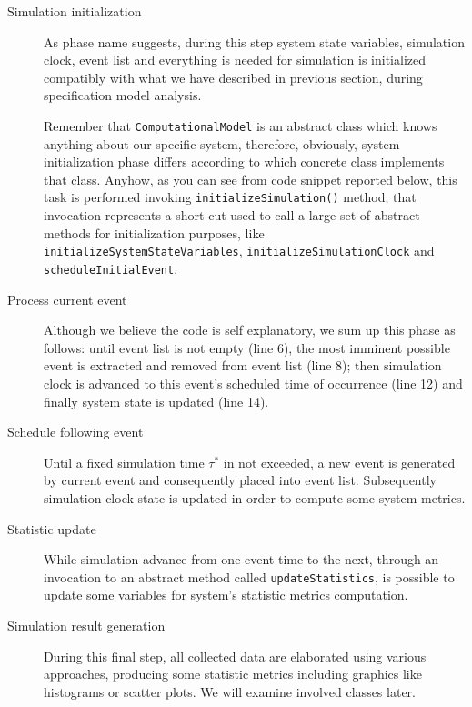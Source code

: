 \documentclass[10pt,a4paper]{article}
\begin{document}
\begin{description}
\item[Simulation initialization] As phase name suggests, during this step system state variables, simulation clock, event list and everything is needed for simulation is initialized compatibly with what we have described in previous section, during specification model analysis.

Remember that \texttt{ComputationalModel} is an abstract class which knows anything about our specific system, therefore, obviously, system initialization phase differs according to which concrete class implements that class. Anyhow, as you can see from code snippet reported below, this task is performed invoking \texttt{initialize\-Simulation()} method; that invocation represents a short-cut used to call a large set of abstract methods for initialization purposes, like \texttt{initializeSystemStateVariables}, \texttt{initializeSimulationClock} and \texttt{scheduleInitialEvent}.

\item[Process current event] Although we believe the code is self explanatory, we sum up this phase as follows: until event list is not empty (line 6), the most imminent possible event is extracted and removed from event list (line 8); then simulation clock is advanced to this event's scheduled time of occurrence (line 12) and finally system state is updated (line 14). 

\item[Schedule following event] Until a fixed simulation time $\tau^*$ in not exceeded, a new event is generated by current event and consequently placed into event list. Subsequently simulation clock state is updated in order to compute some system metrics.

\item[Statistic update] While simulation advance from one event time to the next, through an invocation to an abstract method called \texttt{updateStati\-stics}, is possible to update some variables for system's statistic metrics computation.

\item[Simulation result generation] During this final step, all collected data are elaborated using various approaches, producing some statistic metrics including graphics like histograms or scatter plots. We will examine involved classes later.
\end{description}
\end{document}
